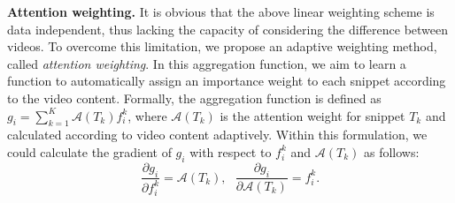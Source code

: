 \documentclass[10pt,journal,compsoc]{IEEEtran}
\begin{document}
{\bf Attention weighting.} It is obvious that the above linear weighting scheme is data independent, thus lacking the capacity of considering the difference between videos. To overcome this limitation, we propose an adaptive weighting method, called {\em attention weighting}. In this aggregation function, we aim to learn a function to automatically assign an importance weight to each snippet according to the video content. Formally, the aggregation function is defined as $g_i = \sum_{k=1}^K \mathcal{A}(T_k) f_i^k$, where $\mathcal{A}(T_k)$ is the attention weight for snippet $T_k$ and calculated according to video content adaptively. Within this formulation, we could calculate the gradient of $g_i$ with respect to $f_i^k$ and $\mathcal{A}(T_k)$ as follows:
\begin{equation}
\frac{\partial g_i}{\partial f_i^k} = \mathcal{A}(T_k), \ \ \ \frac{\partial g_i}{\partial \mathcal{A}(T_k)} = f_i^k.
\end{equation}
\end{document}
